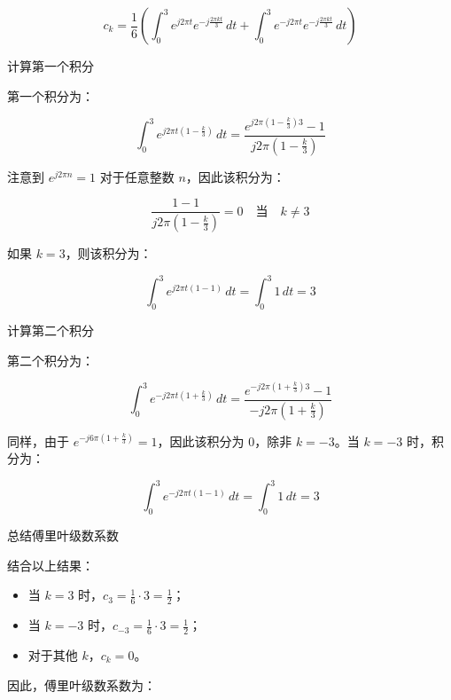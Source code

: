 \documentclass[UTF8]{report}
\theoremstyle{MyLineTheoremStyle} %
\theoremstyle{MyBlockTheoremStyle} %
\theoremstyle{MySubsubsectionStyle} %
\begin{document}
\begin{equation}
c_k = \frac{1}{6} \left( \int_0^3 e^{j 2\pi t} e^{-j \frac{2\pi k t}{3}} \, dt + \int_0^3 e^{-j 2\pi t} e^{-j \frac{2\pi k t}{3}} \, dt \right)
\end{equation}

计算第一个积分

第一个积分为：

\begin{equation}
\int_0^3 e^{j 2\pi t (1 - \frac{k}{3})} \, dt = \frac{e^{j 2\pi (1 - \frac{k}{3}) 3} - 1}{j 2\pi (1 - \frac{k}{3})}
\end{equation}

注意到 $e^{j 2\pi n} = 1$ 对于任意整数 $n$，因此该积分为：

\begin{equation}
\frac{1 - 1}{j 2\pi (1 - \frac{k}{3})} = 0 \quad \text{当} \quad k \neq 3
\end{equation}

如果 $k = 3$，则该积分为：

\begin{equation}
\int_0^3 e^{j 2\pi t (1 - 1)} \, dt = \int_0^3 1 \, dt = 3
\end{equation}

计算第二个积分

第二个积分为：

\begin{equation}
\int_0^3 e^{-j 2\pi t (1 + \frac{k}{3})} \, dt = \frac{e^{-j 2\pi (1 + \frac{k}{3}) 3} - 1}{-j 2\pi (1 + \frac{k}{3})}
\end{equation}

同样，由于 $e^{-j 6\pi (1 + \frac{k}{3})} = 1$，因此该积分为 0，除非 $k = -3$。当 $k = -3$ 时，积分为：

\begin{equation}
\int_0^3 e^{-j 2\pi t (1 - 1)} \, dt = \int_0^3 1 \, dt = 3
\end{equation}

总结傅里叶级数系数

结合以上结果：

\begin{itemize}
    \item 当 $k = 3$ 时，$c_3 = \frac{1}{6} \cdot 3 = \frac{1}{2}$；
    \item 当 $k = -3$ 时，$c_{-3} = \frac{1}{6} \cdot 3 = \frac{1}{2}$；
    \item 对于其他 $k$，$c_k = 0$。
\end{itemize}

因此，傅里叶级数系数为：
\end{document}
